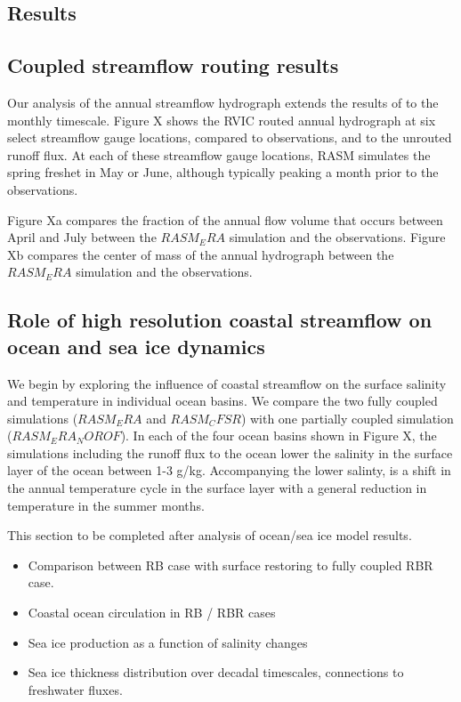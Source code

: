 \documentclass[ms, draft]{agutex}
\begin{document}
\begin{article}
\section{Results}

\subsection{Coupled streamflow routing results}

Our analysis of the annual streamflow hydrograph extends the results of \citet{Hamman_2015} to the monthly timescale.
Figure X shows the RVIC routed annual hydrograph at six select streamflow gauge locations, compared to observations, and to the unrouted runoff flux.
At each of these streamflow gauge locations, RASM simulates the spring freshet in May or June, although typically peaking a month prior to the observations.

Figure Xa compares the fraction of the annual flow volume that occurs between April and July between the $RASM_ERA$ simulation and the observations.
Figure Xb compares the center of mass of the annual hydrograph between the $RASM_ERA$ simulation and the observations.

\subsection{Role of high resolution coastal streamflow on ocean and sea ice dynamics}

We begin by exploring the influence of coastal streamflow on the surface salinity and temperature in individual ocean basins.
We compare the two fully coupled simulations ($RASM_ERA$ and $RASM_CFSR$) with one partially coupled simulation ($RASM_ERA_NOROF$).
In each of the four ocean basins shown in Figure X, the simulations including the runoff flux to the ocean lower the salinity in the surface layer of the ocean between 1-3 g/kg.
Accompanying the lower salinty, is a shift in the annual temperature cycle in the surface layer with a general reduction in temperature in the summer months.

This section to be completed after analysis of ocean/sea ice model results.
\begin{itemize}
\item Comparison between RB case with surface restoring to fully coupled RBR case.
\item Coastal ocean circulation in RB / RBR cases
\item Sea ice production as a function of salinity changes
\item Sea ice thickness distribution over decadal timescales, connections to freshwater fluxes.
\end{itemize}


\end{article}
\end{document}

